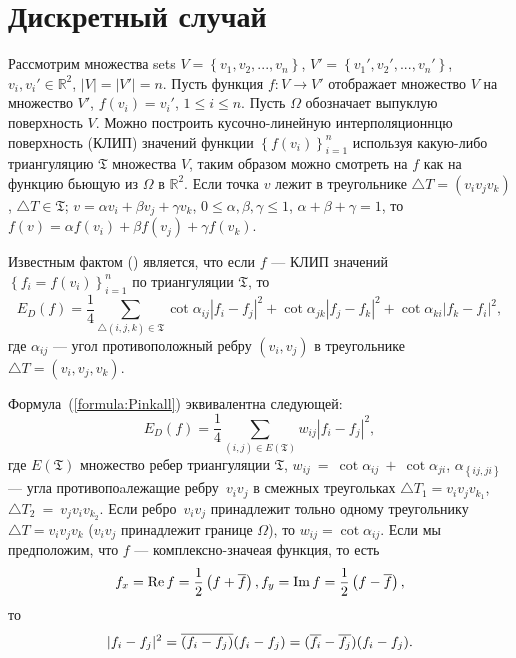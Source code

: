 \section{Дискретный случай}
\label{sec:discrete}

Рассмотрим множества sets $V = \left\{v_1, v_2, ... , v_n\right\}$, 
$V' = \left\{v_1', v_2', ... , v_n'\right\}$,$v_i, v_i' \in \mathbb{R}^2$, $|V| = |V'| = n$. 
Пусть функция $f: V \to V'$ отображает множество $V$ на множество $V'$, $f(v_i) = v_i'$, $1 \le i \le n$. 
Пусть $\Omega$ обозначает выпуклую поверхность $V$. 
Можно построить кусочно-линейную интерполяционнцю поверхность (КЛИП) значений функции 
$\left\{f(v_i)\right\}_{i=1}^n$ используя какую-либо триангуляцию $\mathfrak{T}$ множества $V$, 
таким образом можно смотреть на $f$ как на функцию бьющую из $\Omega$ в $\mathbb{R}^2$. 
Если точка $v$ лежит в треугольнике $\triangle T = (v_i v_j v_k)$, $\triangle T \in \mathfrak{T}$; $
v = \alpha v_i + \beta v_j + \gamma v_k$, $0 \le \alpha, \beta, \gamma \le 1$, $\alpha + \beta + \gamma = 1$, 
то $f(v) = \alpha f(v_i) + \beta f(v_j) + \gamma f(v_k)$.

Известным фактом (\cite{Pinkall93}) является, что если $f$ --- КЛИП значений 
$\left\{f_i = f(v_i)\right\}_{i=1}^n$ по триангуляции $\mathfrak{T}$, то
\begin{equation*}
  E_D(f) = \frac{1}{4} \sum_{\triangle (i, j, k) \in \mathfrak{T}} \cot{\alpha_{ij}}|f_i - f_j|^2 
  + \cot{\alpha_{jk}}|f_j - f_k|^2 + \cot{\alpha_{ki}}|f_k - f_i|^2,
\end{equation*}
где $\alpha_{ij}$ --- угол противоположный ребру $(v_i, v_j)$ в треугольнике $\triangle T = (v_i, v_j, v_k)$.   


Формула~(\ref{formula:Pinkall}) эквивалентна следующей: 
\begin{equation}
\label{formula:EDOverEdges}
  E_D(f) = \frac{1}{4} \sum_{\left( i, j \right) \in E\left(\mathfrak{T}\right)}{w_{ij} |f_i - f_j|^2}, 
\end{equation}
где $E(\mathfrak{T})$ множество ребер триангуляции $\mathfrak{T}$, 
$w_{ij}~=~\cot\alpha_{ij}~+~\cot\alpha_{ji}$, $\alpha_{\left\{{ij, ji}\right\}}$ --- угла 
противопоaлежащие ребру~$v_i v_j$ в смежных треугольках $\triangle T_1=v_i v_j v_{k_1}$, 
$\triangle T_2~=~v_j v_i v_{k_2}$. Если ребро~$v_i v_j$ принадлежит тольно одному треугольнику $\triangle T=v_i v_j v_k$ ($v_i v_j$ принадлежит границе $\Omega$), то $w_{ij} = \cot \alpha_{ij}$.
Если мы предположим, что $f$ --- комплексно-значеая функция, то есть  
$$f_x=\operatorname{Re}{f}=\frac{1}{2}\left(f + \overline{f}\right), f_y=\operatorname{Im}{f}=\frac{1}{2}\left(f - \overline{f}\right),$$ 
то $$|f_i - f_j|^2 = \overline{(f_i - f_j)}(f_i - f_j) = (\overline{f_i} - \overline{f_j})(f_i - f_j).$$ 

